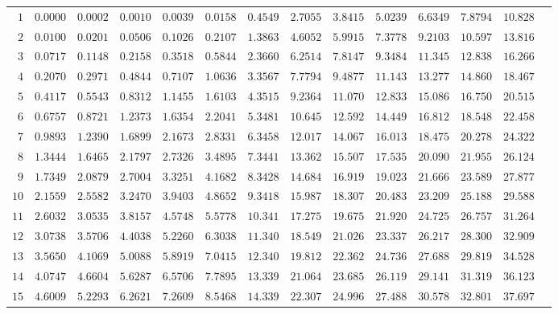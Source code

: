 \begin{center}
\begin{small}
\begin{longtable}[c]{rrrrrrrrrrrrrr}
 $1$ & $0.0000$ & $0.0002$ & $0.0010$ & $0.0039$ & $0.0158$ & $0.4549$ & $2.7055$ & $3.8415$ & $5.0239$ & $6.6349$ & $7.8794$ & $10.828$ \\ 
 $2$ & $0.0100$ & $0.0201$ & $0.0506$ & $0.1026$ & $0.2107$ & $1.3863$ & $4.6052$ & $5.9915$ & $7.3778$ & $9.2103$ & $10.597$ & $13.816$ \\ 
 $3$ & $0.0717$ & $0.1148$ & $0.2158$ & $0.3518$ & $0.5844$ & $2.3660$ & $6.2514$ & $7.8147$ & $9.3484$ & $11.345$ & $12.838$ & $16.266$ \\ 
 $4$ & $0.2070$ & $0.2971$ & $0.4844$ & $0.7107$ & $1.0636$ & $3.3567$ & $7.7794$ & $9.4877$ & $11.143$ & $13.277$ & $14.860$ & $18.467$ \\ 
 $5$ & $0.4117$ & $0.5543$ & $0.8312$ & $1.1455$ & $1.6103$ & $4.3515$ & $9.2364$ & $11.070$ & $12.833$ & $15.086$ & $16.750$ & $20.515$ \\ 
 $6$ & $0.6757$ & $0.8721$ & $1.2373$ & $1.6354$ & $2.2041$ & $5.3481$ & $10.645$ & $12.592$ & $14.449$ & $16.812$ & $18.548$ & $22.458$ \\ 
 $7$ & $0.9893$ & $1.2390$ & $1.6899$ & $2.1673$ & $2.8331$ & $6.3458$ & $12.017$ & $14.067$ & $16.013$ & $18.475$ & $20.278$ & $24.322$ \\ 
 $8$ & $1.3444$ & $1.6465$ & $2.1797$ & $2.7326$ & $3.4895$ & $7.3441$ & $13.362$ & $15.507$ & $17.535$ & $20.090$ & $21.955$ & $26.124$ \\ 
 $9$ & $1.7349$ & $2.0879$ & $2.7004$ & $3.3251$ & $4.1682$ & $8.3428$ & $14.684$ & $16.919$ & $19.023$ & $21.666$ & $23.589$ & $27.877$ \\[4pt] 
 $10$ & $2.1559$ & $2.5582$ & $3.2470$ & $3.9403$ & $4.8652$ & $9.3418$ & $15.987$ & $18.307$ & $20.483$ & $23.209$ & $25.188$ & $29.588$ \\ 
 $11$ & $2.6032$ & $3.0535$ & $3.8157$ & $4.5748$ & $5.5778$ & $10.341$ & $17.275$ & $19.675$ & $21.920$ & $24.725$ & $26.757$ & $31.264$ \\ 
 $12$ & $3.0738$ & $3.5706$ & $4.4038$ & $5.2260$ & $6.3038$ & $11.340$ & $18.549$ & $21.026$ & $23.337$ & $26.217$ & $28.300$ & $32.909$ \\ 
 $13$ & $3.5650$ & $4.1069$ & $5.0088$ & $5.8919$ & $7.0415$ & $12.340$ & $19.812$ & $22.362$ & $24.736$ & $27.688$ & $29.819$ & $34.528$ \\ 
 $14$ & $4.0747$ & $4.6604$ & $5.6287$ & $6.5706$ & $7.7895$ & $13.339$ & $21.064$ & $23.685$ & $26.119$ & $29.141$ & $31.319$ & $36.123$ \\ 
 $15$ & $4.6009$ & $5.2293$ & $6.2621$ & $7.2609$ & $8.5468$ & $14.339$ & $22.307$ & $24.996$ & $27.488$ & $30.578$ & $32.801$ & $37.697$ \\ 

\end{longtable}
\end{small}
\end{center}
